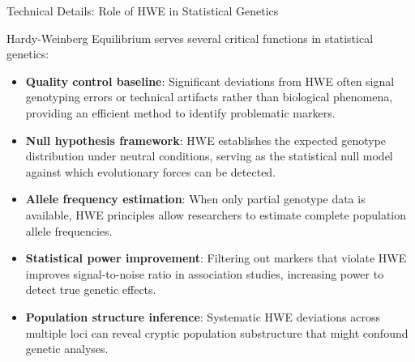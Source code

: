 \begin{frame}{Technical Details: Role of HWE in Statistical Genetics}

Hardy-Weinberg Equilibrium serves several critical functions in statistical genetics:

\begin{itemize}
\item \textbf{Quality control baseline}: Significant deviations from HWE often signal genotyping errors or technical artifacts rather than biological phenomena, providing an efficient method to identify problematic markers.
\end{itemize}

\begin{itemize}
\item \textbf{Null hypothesis framework}: HWE establishes the expected genotype distribution under neutral conditions, serving as the statistical null model against which evolutionary forces can be detected.
\end{itemize}

\begin{itemize}
\item \textbf{Allele frequency estimation}: When only partial genotype data is available, HWE principles allow researchers to estimate complete population allele frequencies.
\end{itemize}

\begin{itemize}
\item \textbf{Statistical power improvement}: Filtering out markers that violate HWE improves signal-to-noise ratio in association studies, increasing power to detect true genetic effects.
\end{itemize}

\begin{itemize}
\item \textbf{Population structure inference}: Systematic HWE deviations across multiple loci can reveal cryptic population substructure that might confound genetic analyses.
\end{itemize}
\end{frame}

